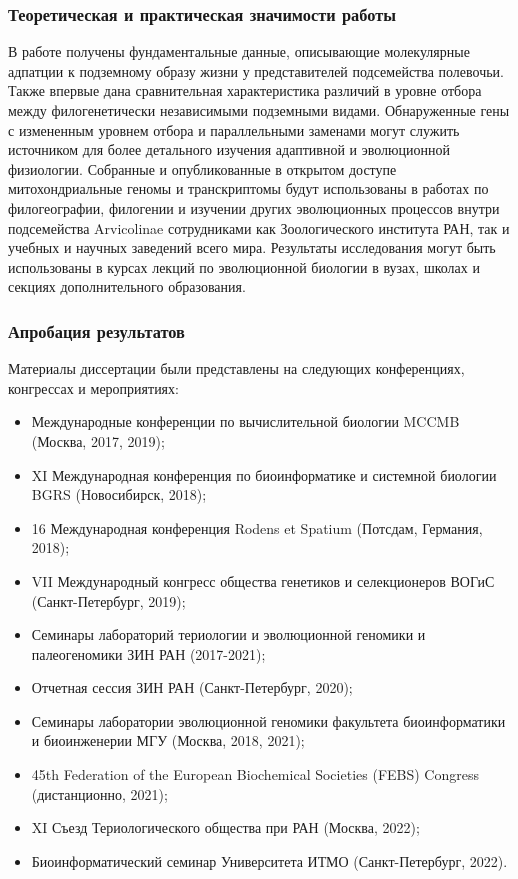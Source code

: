 \subsubsection*{Теоретическая и практическая значимости работы}
В работе получены фундаментальные данные, описывающие молекулярные адпатции к подземному образу жизни у представителей подсемейства полевочьи. Также впервые дана сравнительная характеристика различий в уровне отбора между филогенетически независимыми подземными видами. Обнаруженные гены с измененным уровнем отбора и параллельными заменами могут служить источником для более детального изучения адаптивной и эволюционной физиологии. Собранные и опубликованные в открытом доступе митохондриальные геномы и транскриптомы будут использованы в работах по филогеографии, филогении и изучении других эволюционных процессов внутри подсемейства Arvicolinae сотрудниками как Зоологического института РАН, так и учебных и научных заведений всего мира.   
Результаты исследования могут быть использованы в курсах лекций по эволюционной биологии в вузах, школах и секциях дополнительного образования.
%

\subsubsection*{Апробация результатов}

Материалы диссертации были представлены на следующих конференциях, конгрессах и мероприятиях:
\begin{itemize} 
	\item[\textbullet] Международные конференции по вычислительной биологии MCCMB (Москва, 2017, 2019);
	\item[\textbullet] XI Международная конференция по биоинформатике и системной биологии BGRS (Новосибирск, 2018); 
	\item[\textbullet] 16 Международная конференция Rodens et Spatium (Потсдам, Германия, 2018); 
	\item[\textbullet] VII Международный конгресс общества генетиков и селекционеров ВОГиС (Санкт-Петербург, 2019);
	\item[\textbullet] Семинары лабораторий териологии и эволюционной геномики и палеогеномики ЗИН РАН (2017-2021);
	\item[\textbullet] Отчетная сессия ЗИН РАН (Санкт-Петербург, 2020);
	\item[\textbullet] Семинары лаборатории эволюционной геномики факультета биоинформатики и биоинженерии МГУ (Москва, 2018, 2021);
	\item[\textbullet] 45th Federation of the European Biochemical Societies (FEBS) Congress (дистанционно, 2021);
	\item[\textbullet] XI Съезд Териологического общества при РАН (Москва, 2022);
	\item[\textbullet] Биоинформатический семинар Университета ИТМО (Санкт-Петербург, 2022).
\end{itemize}


